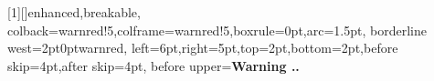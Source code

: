 %
%
%
\usepackage[a4paper,margin=1.9cm]{geometry}
\usepackage{lmodern}
\usepackage[T1]{fontenc}
\usepackage{amsmath,amssymb,amsthm,mathtools}
\usepackage{enumitem}
\usepackage{microtype}
\usepackage{xcolor}
\usepackage[most]{tcolorbox}
\usepackage{etoolbox}
\usepackage{titlesec}



\titlespacing*{\section}{0pt}{1.0em}{0.35em}

\theoremstyle{compactit}
\newtheorem{thm}{Theorem}[section]
\newtheorem{prop}[thm]{Proposition}
\theoremstyle{compactup}
\newtheorem{defn}[thm]{Definition}
\newtheorem{example}[thm]{Example}
\newtheorem{remark}[thm]{Remark}

[1][]{enhanced,breakable,
  colback=warnred!5,colframe=warnred!5,boxrule=0pt,arc=1.5pt,
  borderline west={2pt}{0pt}{warnred},
  left=6pt,right=5pt,top=2pt,bottom=2pt,before skip=4pt,after skip=4pt,
  before upper={\textbf{\color{warnred}Warning \thesection.}\textbf{.}\ }}
\renewcommand{\thethm}{\thesection.\arabic{thm}}

